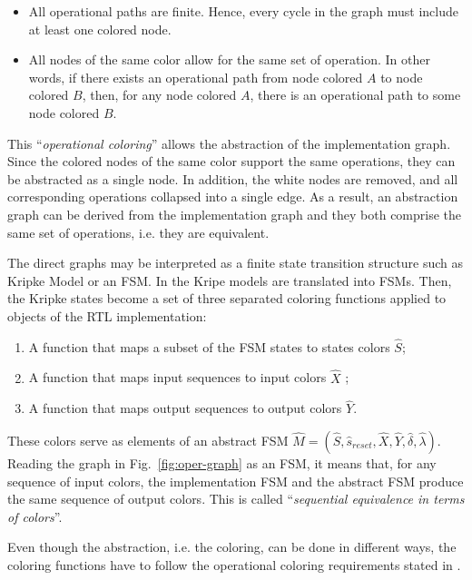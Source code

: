 \begin{itemize}
\item All operational paths are finite. Hence, every cycle in the graph must include at least one colored node. 
\item All nodes of the same color allow for the same set of operation. In other words, if there exists an operational path from node colored $A$ to node colored $B$, then, for any node colored $A$, there is an operational path to some node colored $B$.
\end{itemize}

This “\textit{operational coloring}” allows the abstraction of the implementation graph. Since the colored nodes of the same color support the same operations, they can be abstracted as a single node. In addition, the white nodes are removed, and all corresponding operations collapsed into a single edge. As a result, an abstraction graph can be derived from the implementation graph and they both comprise the same set of operations, i.e. they are equivalent.

The direct graphs may be interpreted as a finite state transition structure such as Kripke Model or an FSM. In \cite{paper-pdd} the Kripe models are translated into FSMs. Then, the Kripke states become a set of three separated coloring functions applied to objects of the RTL implementation:

\begin{enumerate}
    \item A function that maps a subset of the FSM states to states colors $\hat{S}$;
    \item A function that maps input sequences to input colors $\hat{X}$ ; 
    \item A function that maps output sequences to output colors $\hat{Y}$.
\end{enumerate}

These colors serve as elements of an abstract FSM $\hat{M} = (\hat{S}, \hat{s}_{reset}, \hat{X}, \hat{Y}, \hat{\delta}, \hat{\lambda})$. Reading the graph in Fig.~\ref{fig:oper-graph} as an FSM, it means that, for any sequence of input colors, the implementation FSM and the abstract FSM produce the same sequence of output colors. This is called “\textit{sequential equivalence in terms of colors}”.

Even though the abstraction, i.e. the coloring, can be done in different ways, the coloring functions have to follow the operational coloring requirements stated in \cite{paper-ppa}.

